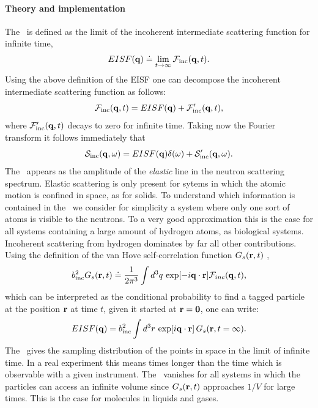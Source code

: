 \documentclass[a4paper,11pt]{report}
\begin{document}
\paragraph{Theory and implementation\\}
\label{eisf_theory}
The \EISF\ is defined as the limit of the incoherent intermediate scattering function 
for infinite time,
\begin{equation}
\label{eq:eisf}
EISF({\bf q}) \doteq \lim_{t \to \infty} {\cal F}_{\mathrm{inc}}({\bf q},t).
\end{equation}
Using the above definition of the EISF one can decompose the incoherent intermediate scattering function as follows:
\begin{equation}
{\cal F}_{\mathrm{inc}}({\bf q},t) = EISF({\bf q}) + {\cal F}_{\mathrm{inc}}'({\bf q},t),
\end{equation}
where ${\cal F}_{\mathrm{inc}}'({\bf q},t)$ decays to zero for infinite time.
Taking now the Fourier transform it follows immediately that
\begin{equation}
{\cal S}_{\mathrm{inc}}({\bf q},\omega) = EISF({\bf q})\delta(\omega) 
+ {\cal S}'_{\mathrm{inc}}({\bf q},\omega).
\end{equation}
The \EISF\ appears as the amplitude of the {\em elastic} line in the neutron scattering spectrum. Elastic scattering is 
only present for sytems in which the atomic motion is confined in space, as for solids. To understand which information 
is contained in the \EISF\ we consider for simplicity a system where only one sort of atoms is visible to the neutrons. 
To a very good approximation this is the case for all systems containing a large amount of hydrogen atoms, as biological
systems. Incoherent scattering from hydrogen dominates by far all other contributions. Using the definition of the van Hove 
self-correlation function $G_s({\bf r},t)$ \cite{Lovesey},
\begin{equation}
b_{\mathrm{inc}}^2 G_s({\bf r},t) \doteq \frac{1}{2\pi^3}
\int d^3q\,\exp[-i{\bf q}\cdot{\bf r}] {\cal F}_{inc}({\bf q},t),
\end{equation}
which can be interpreted as the conditional probability to find a tagged particle at the position ${\bf r}$ at time $t$, 
given it started at ${\bf r} = {\bf 0}$,  one can write:
\begin{equation}
\label{eq:eisf_g_s}
EISF({\bf q}) = b_{\mathrm{inc}}^2\int d^3r\,\exp[i{\bf q}\cdot{\bf r}]\,
G_s({\bf r},t=\infty).
\end{equation}
The \EISF\ gives the sampling distribution of the points in space in the limit of infinite time. In a real experiment this 
means times longer than the time which is observable with a given instrument. The \EISF\ vanishes for all systems in which 
the particles can access an infinite volume since $G_s({\bf r},t)$ approaches $1/V$ for large times. This is the case for 
molecules in liquids and gases.
\end{document}
